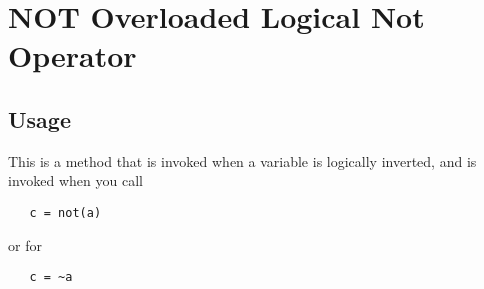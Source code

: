 \section{NOT Overloaded Logical Not Operator}

\subsection{Usage}

This is a method that is invoked when a variable is logically
inverted, and is invoked when you call
\begin{verbatim}
   c = not(a)
\end{verbatim}
or for
\begin{verbatim}
   c = ~a
\end{verbatim}
